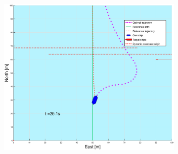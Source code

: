 \begin{figure}[!b]
\begin{subfigure}[b]{0.49\textwidth}
    \end{subfigure}
    \hfill
    \begin{subfigure}[b]{0.499\textwidth}
        \centering
        \includegraphics[width=\textwidth]{Images/Figures/enkel_GW/_Simple_0fig999_time=25}
    \end{subfigure}
    \hfill
\end{figure}%
